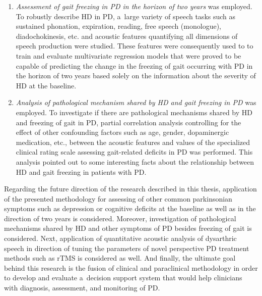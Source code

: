 \begin{enumerate}
	\item \textit{Assessment of gait freezing in PD in the horizon of two years} was employed. To robustly describe HD in PD, a~large variety of speech tasks such as sustained phonation, expiration, reading, free speech (monologue), diadochokinesis, etc. and acoustic features quantifying all dimensions of speech production were studied. These features were consequently used to to train and evaluate multivariate regression models that were proved to be capable of predicting the change in the freezing of gait occurring with PD in the horizon of two years based solely on the information about the severity of HD at the baseline.
	\item \textit{Analysis of pathological mechanism shared by HD and gait freezing in PD} was employed. To investigate if there are pathological mechanisms shared by HD and freezing of gait in PD, partial correlation analysis controlling for the effect of other confounding factors such as age, gender, dopaminergic medication, etc., between the acoustic features and values of the specialized clinical rating scale assessing gait-related deficits in PD was performed. This analysis pointed out to some interesting facts about the relationship between HD and gait freezing in patients with PD.
\end{enumerate}

Regarding the future direction of the research described in this thesis, application of the presented methodology for assessing of other common parkinsonian symptoms such as depression or cognitive deficits at the baseline as well as in the direction of two years is considered. Moreover, investigation of pathological mechanisms shared by HD and other symptoms of PD besides freezing of gait is considered. Next, application of quantitative acoustic analysis of dysarthric speech in direction of tuning the parameters of novel perspective PD treatment methods such as rTMS is considered as well. And finally, the ultimate goal behind this research is the fusion of clinical and paraclinical methodology in order to develop and evaluate a~decision support system that would help clinicians with diagnosis, assessment, and monitoring of PD.